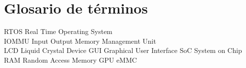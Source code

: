 \section{Glosario de términos}

RTOS    Real Time Operating System\\
IOMMU   Input Output Memory Management Unit\\
LCD     Liquid Crystal Device
GUI     Graphical User Interface
SoC     System on Chip
RAM     Random Access Memory
GPU
eMMC
